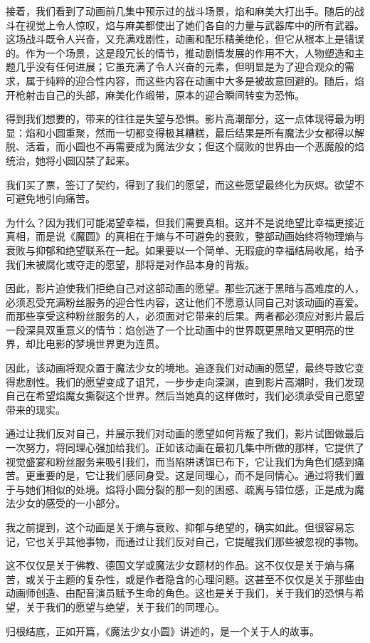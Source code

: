接着，我们看到了动画前几集中预示过的战斗场景，焰和麻美大打出手。随后的战斗在视觉上令人惊叹，焰与麻美都使出了她们各自的力量与武器库中的所有武器。这场战斗既令人兴奋，又充满戏剧性，动画和配乐精美绝伦，但它从根本上是错误的。作为一个场景，这是段冗长的情节，推动剧情发展的作用不大，人物塑造和主题几乎没有任何进展；它虽充满了令人兴奋的元素，但明显是为了迎合观众的需求，属于纯粹的迎合性内容，而这些内容在动画中大多是被故意回避的。随后，焰开枪射击自己的头部，麻美化作缎带，原本的迎合瞬间转变为恐怖。

得到我们想要的，带来的往往是失望与恐惧。影片高潮部分，这一点体现得最为明显：焰和小圆重聚，然而一切都变得极其糟糕，最后结果是所有魔法少女都得以解脱、活着，而小圆也不再需要成为魔法少女；但这个腐败的世界由一个恶魔般的焰统治，她将小圆囚禁了起来。

我们买了票，签订了契约，得到了我们的愿望，而这些愿望最终化为灰烬。欲望不可避免地引向痛苦。

为什么？因为我们可能渴望幸福，但我们需要真相。这并不是说绝望比幸福更接近真相，而是说《魔圆》的真相在于熵与不可避免的衰败，整部动画始终将物理熵与衰败与抑郁和绝望联系在一起。如果要以一个简单、无瑕疵的幸福结局收尾，给予我们未被腐化或夺走的愿望，那将是对作品本身的背叛。

因此，影片迫使我们拒绝自己对这部动画的愿望。那些沉迷于黑暗与高难度的人，必须忍受充满粉丝服务的迎合性内容，这让他们不愿意认同自己对该动画的喜爱。而那些享受这种粉丝服务的人，必须面对它带来的后果。两者都必须应对影片最后一段深具双重意义的情节：焰创造了一个比动画中的世界既更黑暗又更明亮的世界，却比电影的梦境世界更为连贯。

因此，该动画将观众置于魔法少女的境地。追逐我们对动画的愿望，最终导致它变得悲剧性。我们的愿望变成了诅咒，一步步走向深渊，直到影片高潮时，我们发现自己在希望焰魔女撕裂这个世界。然后当她真的这样做时，我们必须承受自己愿望带来的现实。

通过让我们反对自己，并展示我们对动画的愿望如何背叛了我们，影片试图做最后一次努力，将同理心强加给我们。正如该动画在最初几集中所做的那样，它提供了视觉盛宴和粉丝服务来吸引我们，而当陷阱诱饵已布下，它让我们为角色们感到痛苦。更重要的是，它让我们感同身受。这是同理心，而不是同情心。通过将我们置于与她们相似的处境。焰将小圆分裂的那一刻的困惑、疏离与错位感，正是成为魔法少女的感受的一小部分。

我之前提到，这个动画是关于熵与衰败、抑郁与绝望的，确实如此。但很容易忘记，它也关乎其他事物，而通过让我们反对自己，它提醒我们那些被忽视的事物。

这不仅仅是关于佛教、德国文学或魔法少女题材的作品。这不仅仅是关于熵与痛苦，或关于主题的复杂性，或是作者隐含的心理问题。这甚至不仅仅是关于那些由动画师创造、由配音演员赋予生命的角色。这也是关于我们，关于我们的恐惧与希望，关于我们的愿望与绝望，关于我们的同理心。

归根结底，正如开篇，《魔法少女小圆》讲述的，是一个关于人的故事。